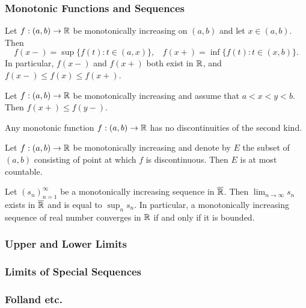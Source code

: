 \documentclass[12pt]{article} %
\begin{document}
\subsubsection{Monotonic Functions and Sequences}

\begin{theorem}
    Let $f : (a, b) \to \mathbb{R}$ be monotonically increasing on $(a, b)$ and let $x \in (a, b)$. Then \[f(x-) = \sup\{f(t) : t \in (a, x)\}, \ \ \ \ f(x+) = \inf\{f(t) : t \in (x, b)\}.\] In particular, $f(x-)$ and $f(x+)$ both exist in $\mathbb{R}$, and $f(x-) \leq f(x) \leq f(x+)$.
\end{theorem}

\begin{corollary}
    Let $f : (a, b) \to \mathbb{R}$ be monotonically increasing and assume that $a < x < y < b$. Then $f(x+) \leq f(y-)$.
\end{corollary}

\begin{corollary}
    Any monotonic function $f : (a, b) \to \mathbb{R}$ has no discontinuities of the second kind.
\end{corollary}

\begin{theorem}
    Let $f : (a, b) \to \mathbb{R}$ be monotonically increasing and denote by $E$ the subset of $(a, b)$ consisting of point at which $f$ is discontinuous. Then $E$ is at most countable.
\end{theorem}

\begin{theorem}
    Let $(s_n)_{n=1}^{\infty}$ be a monotonically increasing sequence in $\overline{\mathbb{R}}$. Then $\lim_{n \to \infty} s_n$ exists in $\overline{\mathbb{R}}$ and is equal to $\sup_n s_n$. In particular, a monotonically increasing sequence of real number converges in $\mathbb{R}$ if and only if it is bounded.
\end{theorem}

\subsubsection{Upper and Lower Limits}


\subsubsection{Limits of Special Sequences}



\subsubsection{Folland etc.}
\end{document}
